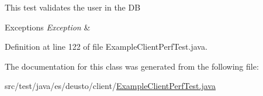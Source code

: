 This test validates the user in the DB 
\begin{DoxyExceptions}{Exceptions}
{\em Exception} & \\
\hline
\end{DoxyExceptions}


Definition at line 122 of file Example\+Client\+Perf\+Test.\+java.



The documentation for this class was generated from the following file\+:\begin{DoxyCompactItemize}
\item 
src/test/java/es/deusto/client/\hyperlink{_example_client_perf_test_8java}{Example\+Client\+Perf\+Test.\+java}\end{DoxyCompactItemize}
